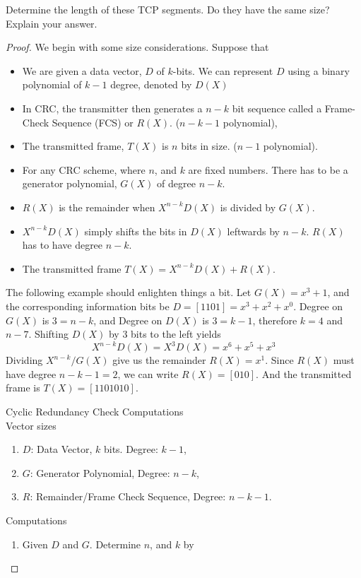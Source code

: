 \documentclass[../../main.tex]{subfiles}
\begin{document}
\begin{wts}
Determine the length of these TCP segments. Do they have the same size? Explain your answer.
\end{wts}
\begin{proof}
We begin with some size considerations. Suppose that
\begin{itemize}
    \item We are given a data vector, $D$ of $k$-bits. We can represent $D$ using a binary polynomial of $k-1$ degree, denoted by $D(X)$
    \item In CRC, the transmitter then generates a $n-k$ bit sequence called a Frame-Check Sequence (FCS) or $R(X)$. ($n-k-1$ polynomial),
    \item The transmitted frame, $T(X)$ is $n$ bits in size. ($n-1$ polynomial).
    \item For any CRC scheme, where $n$, and $k$ are fixed numbers. There has to be a generator polynomial, $G(X)$ of degree $n-k$.
    \item $R(X)$ is the remainder when $X^{n-k}D(X)$ is divided by $G(X)$.
    \item $X^{n-k}D(X)$ simply shifts the bits in $D(X)$ leftwards by $n-k$. $R(X)$ has to have degree $n-k$.
    \item The transmitted frame $T(X) = X^{n-k}D(X) + R(X)$.
\end{itemize}
The following example should enlighten things a bit. Let $G(X) = x^3 + 1$, and the corresponding information bits be $D = [1101]=x^3+x^2+x^0$. Degree on $G(X)$ is $3=n-k$, and Degree on $D(X)$ is $3=k-1$, therefore $k=4$ and $n-7$. Shifting $D(X)$ by $3$ bits to the left yields
\[
X^{n-k}D(X) = X^3D(X) = x^6 + x^5 + x^3
\]
Dividing $X^{n-k}/G(X)$ give us the remainder $R(X) = x^1$. Since $R(X)$ must have degree $n-k-1=2$, we can write $R(X) = [010]$. And the transmitted frame is $T(X) = [1101010]$.
\begin{wtr} Cyclic Redundancy Check Computations\\[2ex]
    Vector sizes
    \begin{enumerate}
        \item $D$: Data Vector, $k$ bits. Degree: $k-1$,
        \item $G$: Generator Polynomial, Degree: $n-k$,
        \item $R$: Remainder/Frame Check Sequence, Degree: $n-k-1$.
    \end{enumerate}
    Computations
    \begin{enumerate}
        \item Given $D$ and $G$. Determine $n$, and $k$ by

\end{enumerate}
\end{wtr}
\end{proof}
\end{document}
